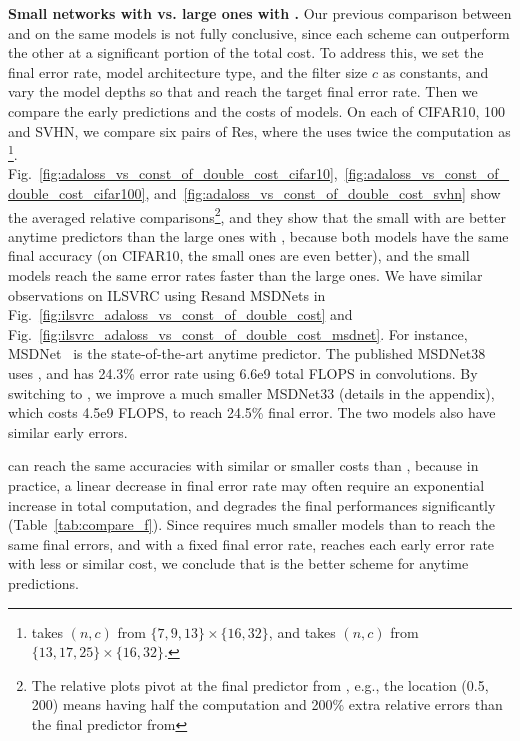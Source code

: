 \textbf{Small networks with \adaloss vs. large ones with \const.} 
Our previous comparison between \adaloss and \const on the same models is not fully conclusive, since each scheme can outperform the other at a significant portion of the total cost. To address this, we set the final error rate, model architecture type, and the filter size $c$ as constants, and vary the model depths so that \adaloss and \const reach the target final error rate. Then we compare the early predictions and the costs of models. 
On each of CIFAR10, 100 and SVHN, we compare six pairs of Res\anns, where the \const uses twice the computation as \adaloss\footnote{\adaloss takes $(n,c)$ from $\{7,9,13\} \times \{16, 32\}$, and \const takes $(n,c)$ from $\{13,17,25\} \times \{16, 32\}$.}. Fig.~\ref{fig:adaloss_vs_const_of_double_cost_cifar10},~\ref{fig:adaloss_vs_const_of_double_cost_cifar100}, and~\ref{fig:adaloss_vs_const_of_double_cost_svhn} show the averaged relative comparisons\footnote{The relative plots pivot at the final predictor from \adaloss, e.g., the location (0.5, 200) means having half the computation and 200\% extra relative errors than the final predictor from \adaloss}, and they show that the small \anns with \adaloss are better anytime predictors than the large ones with \const, because both models have the same final accuracy (on CIFAR10, the small ones are even better), and the small models reach the same error rates faster than the large ones. We have similar observations on ILSVRC using Res\anns and MSDNets in Fig.~\ref{fig:ilsvrc_adaloss_vs_const_of_double_cost} and Fig.~\ref{fig:ilsvrc_adaloss_vs_const_of_double_cost_msdnet}.
For instance, MSDNet~\cite{msdense} is the state-of-the-art anytime predictor. The published MSDNet38 uses \const, and has 24.3\% error rate using 6.6e9 total FLOPS in convolutions. By switching to \adaloss, we improve a much smaller MSDNet33 (details in the appendix), which costs 4.5e9 FLOPS, to reach 24.5\% final error. The two models also have similar early errors. 

\adaloss can reach the same accuracies with similar or smaller costs than \const, because in practice, a linear decrease in final error rate may often require an exponential increase in total computation, and \const degrades the final performances significantly (Table~\ref{tab:compare_f}). Since \adaloss requires much smaller models than \const to reach the same final errors, and with a fixed final error rate, \adaloss reaches each early error rate with less or similar cost, we conclude that \adaloss is the better scheme for anytime predictions. 


